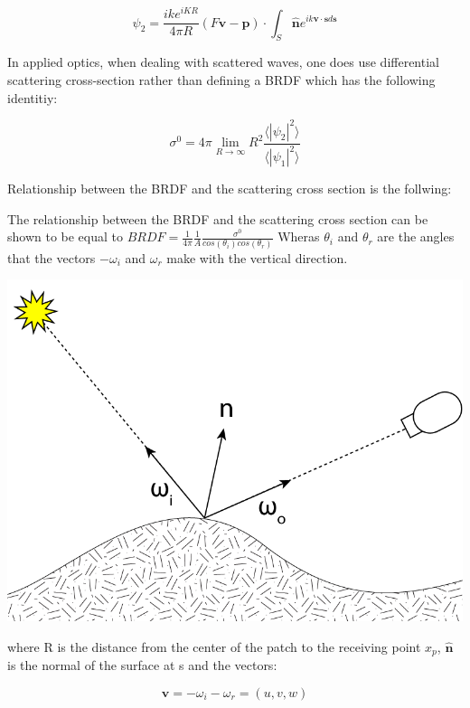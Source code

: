 \begin{equation}
  \psi_2 = \frac{i k e^{i K R}}{4 \pi R}(F\mathbf{v}-\mathbf{p}) \cdot \int_{S} \hat{\mathbf{n}} e^{ik\mathbf{v} \cdot \mathbf{s} d\mathbf{s}}
\end{equation}


In applied optics, when dealing with scattered waves, one does use differential scattering cross-section rather than defining a BRDF which has the following identitiy: 

\begin{equation}
    \sigma^0 = 4 \pi \lim_{R \to \infty} R^2 \frac{\langle \left|\psi_2\right|^2\rangle}{\langle \left|\psi_1\right|^2\rangle}
\end{equation}

Relationship between the BRDF and the scattering cross section is the follwing:

The relationship between the BRDF and the scattering cross section can be shown to be equal to $BRDF = \frac{1}{4\pi}\frac{1}{A}\frac{\sigma^0}{cos(\theta_i)cos(\theta_r)}$
Wheras $\theta_i$ and $\theta_r$ are the angles that the vectors $-\omega_i$
and $\omega_r$ make with the vertical direction.
 
\includegraphics[scale=0.25]{images/brdfdiagram.png}

where R is the distance from the center of the patch to the receiving point $x_p$, $\hat{\mathbf{n}}$ is the normal of the surface at s and the vectors:

\begin{equation*}
    \mathbf{v} = -\omega_i - \omega_r
               = (u,v,w)
\end{equation*}

